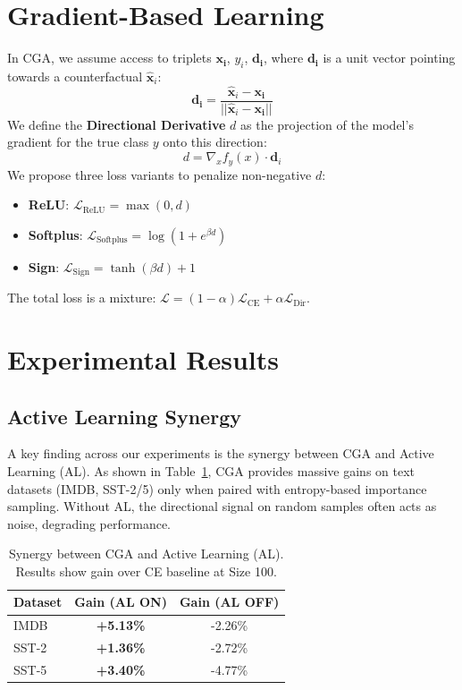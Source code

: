 \documentclass[sigconf,anonymous]{aamas}
\begin{document}
\section{Gradient-Based Learning}
In CGA, we assume access to triplets {\(\mathbf{x_i}\), \(y_i\), \(\mathbf{d_i}\)}, where \(\mathbf{d_i}\) is a unit vector pointing towards a counterfactual \(\hat{\mathbf{x}}_i\):
\begin{equation}
    \mathbf{d_i}=\frac{\hat{\mathbf{x}}_i - \mathbf{x_i}}{|\!|\hat{\mathbf{x}}_i - \mathbf{x_i}||}
\end{equation}
We define the \textbf{Directional Derivative} $d$ as the projection of the model's gradient for the true class $y$ onto this direction:
\begin{equation}
    d = \nabla_x f_{y}(x) \cdot \mathbf{d}_{i}
\end{equation}
We propose three loss variants to penalize non-negative $d$:
\begin{itemize}
    \item \textbf{ReLU}: $\mathcal{L}_{\text{ReLU}} = \max(0, d)$
    \item \textbf{Softplus}: $\mathcal{L}_{\text{Softplus}} = \log(1 + e^{\beta d})$
    \item \textbf{Sign}: $\mathcal{L}_{\text{Sign}} = \tanh(\beta d) + 1$
\end{itemize}
The total loss is a mixture: $\mathcal{L} = (1-\alpha)\mathcal{L}_{\text{CE}} + \alpha\mathcal{L}_{\text{Dir}}$.

\section{Experimental Results}

\subsection{Active Learning Synergy}
A key finding across our experiments is the synergy between CGA and Active Learning (AL). As shown in Table~\ref{tab:al_synergy}, CGA provides massive gains on text datasets (IMDB, SST-2/5) only when paired with entropy-based importance sampling. Without AL, the directional signal on random samples often acts as noise, degrading performance.

\begin{table}[h]
\centering
\caption{Synergy between CGA and Active Learning (AL). Results show gain over CE baseline at Size 100.}
\label{tab:al_synergy}
\begin{tabular}{@{}lcc@{}}
\toprule
\textbf{Dataset} & \textbf{Gain (AL ON)} & \textbf{Gain (AL OFF)} \\ \midrule
IMDB & \textbf{+5.13\%} & -2.26\% \\
SST-2 & \textbf{+1.36\%} & -2.72\% \\
SST-5 & \textbf{+3.40\%} & -4.77\% \\ \bottomrule
\end{tabular}
\end{table}
\end{document}
